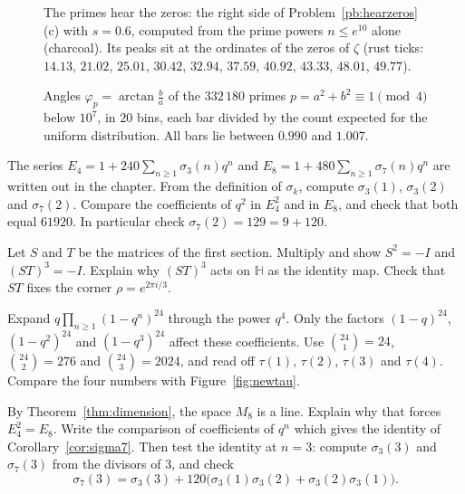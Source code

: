 \begin{figure}[ht]
\centering
{}
\caption{The primes hear the zeros: the right side of Problem~\ref{pb:hearzeros}(c) with $s=0.6$, computed from the prime powers $n\le e^{10}$ alone (charcoal). Its peaks
sit at the ordinates of the zeros of $\zeta$ (rust ticks: $14.13$, $21.02$, $25.01$, $30.42$, $32.94$, $37.59$, $40.92$, $43.33$, $48.01$, $49.77$).}\label{fig:hearzeros}
\end{figure}

\begin{figure}[ht]
\centering
{}
\caption{Angles $\varphi_p=\arctan\frac ba$ of the $332\,180$ primes $p=a^2+b^2\equiv1\pmod4$ below $10^7$, in $20$ bins, each bar divided by the count expected for the
uniform distribution. All bars lie between $0.990$ and $1.007$.}\label{fig:angles}
\end{figure}


\begin{exercise}[$\star$]\label{ex:q2hand}
The series $E_4=1+240\sum_{n\ge1}\sigma_3(n)q^n$ and $E_8=1+480\sum_{n\ge1}\sigma_7(n)q^n$ are written out in the chapter. From the definition of $\sigma_k$, compute $\sigma_3(1)$, $\sigma_3(2)$ and $\sigma_7(2)$. Compare the coefficients of $q^2$ in $E_4^2$ and in $E_8$, and check that both equal $61920$. In particular check $\sigma_7(2)=129=9+120$.
\end{exercise}

\begin{exercise}[$\star$]\label{ex:strels}
Let $S$ and $T$ be the matrices of the first section. Multiply and show $S^2=-I$ and $(ST)^3=-I$. Explain why $(ST)^3$ acts on $\mathbb H$ as the identity map. Check that $ST$ fixes the corner $\rho=e^{2\pi i/3}$.
\end{exercise}

\begin{exercise}[$\star\star$]\label{ex:lowtau}
Expand $q\prod_{n\ge1}(1-q^n)^{24}$ through the power $q^4$. Only the factors $(1-q)^{24}$, $(1-q^2)^{24}$ and $(1-q^3)^{24}$ affect these coefficients. Use $\binom{24}{1}=24$, $\binom{24}{2}=276$ and $\binom{24}{3}=2024$, and read off $\tau(1)$, $\tau(2)$, $\tau(3)$ and $\tau(4)$. Compare the four numbers with Figure~\ref{fig:newtau}.
\end{exercise}

\begin{exercise}[$\star\star\star$]\label{ex:sigma3}
By Theorem~\ref{thm:dimension}, the space $M_8$ is a line. Explain why that forces $E_4^2=E_8$. Write the comparison of coefficients of $q^n$ which gives the identity of Corollary~\ref{cor:sigma7}. Then test the identity at $n=3$: compute $\sigma_3(3)$ and $\sigma_7(3)$ from the divisors of $3$, and check
\[
\sigma_7(3)=\sigma_3(3)+120\bigl(\sigma_3(1)\sigma_3(2)+\sigma_3(2)\sigma_3(1)\bigr).
\]
\end{exercise}

